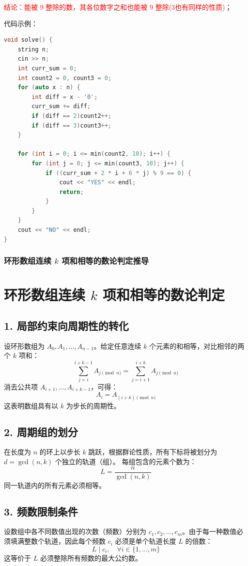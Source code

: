 \begin{itemize}
\textcolor{red}{结论：能被 9 整除的数，其各位数字之和也能被 9 整除(3也有同样的性质)}；

代码示例：\\
\begin{lstlisting}[language=C++]
void solve() {
	string n;
	cin >> n;
	int curr_sum = 0;
	int count2 = 0, count3 = 0;
	for (auto x : n) {
		int diff = x - '0';
		curr_sum += diff;
		if (diff == 2)count2++;
		if (diff == 3)count3++;
	}
	
	for (int i = 0; i <= min(count2, 10); i++) {
		for (int j = 0; j <= min(count3, 10); j++) {
			if ((curr_sum + 2 * i + 6 * j) % 9 == 0) {
				cout << "YES" << endl;
				return;
			}
		}
	}
	cout << "NO" << endl;
}
\end{lstlisting}
\subsubsection{环形数组连续 $k$ 项和相等的数论判定推导}
\section*{环形数组连续 $k$ 项和相等的数论判定}

\subsection*{1. 局部约束向周期性的转化}
设环形数组为 $A_0, A_1, \dots, A_{n-1}$。给定任意连续 $k$ 个元素的和相等，对比相邻的两个 $k$ 项和：
\[
\sum_{j=i}^{i+k-1} A_{j \pmod n} = \sum_{j=i+1}^{i+k} A_{j \pmod n}
\]
消去公共项 $A_{i+1}, \dots, A_{i+k-1}$，可得：
\[
A_i = A_{(i+k) \pmod n}
\]
这表明数组具有以 $k$ 为步长的周期性。

\subsection*{2. 周期组的划分}
在长度为 $n$ 的环上以步长 $k$ 跳跃，根据群论性质，所有下标将被划分为 $d = \gcd(n, k)$ 个独立的轨道（组）。
每组包含的元素个数为：
\[
L = \frac{n}{\gcd(n, k)}
\]
同一轨道内的所有元素必须相等。

\subsection*{3. 频数限制条件}
设数组中各不同数值出现的次数（频数）分别为 $c_1, c_2, \dots, c_m$。由于每一种数值必须填满整数个轨道，因此每个频数 $c_i$ 必须是单个轨道长度 $L$ 的倍数：
\[
L \mid c_i, \quad \forall i \in \{1, \dots, m\}
\]
这等价于 $L$ 必须整除所有频数的最大公约数。


\end{itemize}
